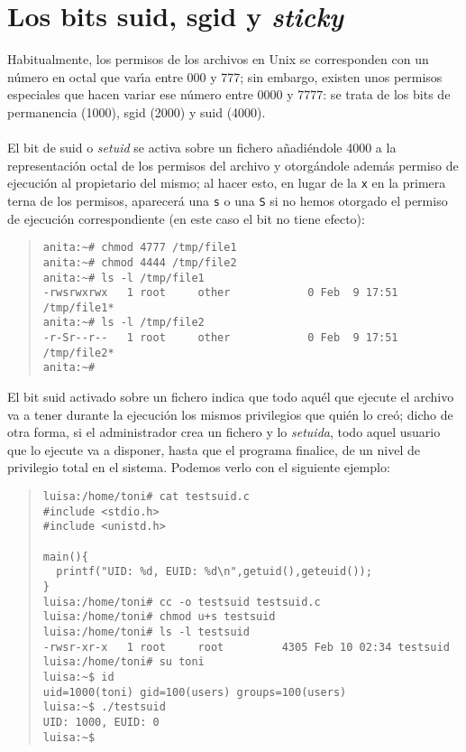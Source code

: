 \section{Los bits {\sc suid}, {\sc sgid} y {\it sticky}}
Habitualmente, los permisos de los archivos en Unix se corresponden con un
n\'umero en octal que var\'{\i}a entre 000 y 777; sin embargo, existen unos
permisos especiales que hacen variar ese n\'umero entre 0000 y 7777: se trata
de los bits de permanencia (1000), {\sc sgid} (2000) y {\sc suid} (4000).\\
\\El bit de {\sc suid} o {\it setuid} se activa sobre un fichero 
a\~nadi\'endole 4000 a la
representaci\'on octal de los permisos del archivo y otorg\'andole adem\'as
permiso de ejecuci\'on al propietario del mismo; al hacer esto, en lugar de
la {\tt x} en la primera terna de los permisos, aparecer\'a una {\tt s} o una
{\tt S} si no hemos otorgado el permiso de ejecuci\'on correspondiente (en 
este caso el bit no tiene efecto):
\begin{quote}
\begin{verbatim}
anita:~# chmod 4777 /tmp/file1
anita:~# chmod 4444 /tmp/file2
anita:~# ls -l /tmp/file1 
-rwsrwxrwx   1 root     other            0 Feb  9 17:51 /tmp/file1*
anita:~# ls -l /tmp/file2
-r-Sr--r--   1 root     other            0 Feb  9 17:51 /tmp/file2*
anita:~# 
\end{verbatim}
\end{quote}
El bit {\sc suid} activado sobre un fichero  indica que todo aqu\'el que
ejecute el archivo va a tener durante la ejecuci\'on los mismos privilegios que
qui\'en lo cre\'o; dicho de otra forma, si el administrador crea un fichero
y lo {\it setuida}, todo aquel usuario que lo ejecute va a disponer, hasta que
el programa finalice, de un nivel de privilegio total en el sistema. Podemos 
verlo con el siguiente ejemplo:
\begin{quote}
\begin{verbatim}
luisa:/home/toni# cat testsuid.c
#include <stdio.h>
#include <unistd.h>

main(){
  printf("UID: %d, EUID: %d\n",getuid(),geteuid());
}
luisa:/home/toni# cc -o testsuid testsuid.c
luisa:/home/toni# chmod u+s testsuid
luisa:/home/toni# ls -l testsuid
-rwsr-xr-x   1 root     root         4305 Feb 10 02:34 testsuid
luisa:/home/toni# su toni
luisa:~$ id
uid=1000(toni) gid=100(users) groups=100(users)
luisa:~$ ./testsuid
UID: 1000, EUID: 0
luisa:~$ 
\end{verbatim}
\end{quote}
